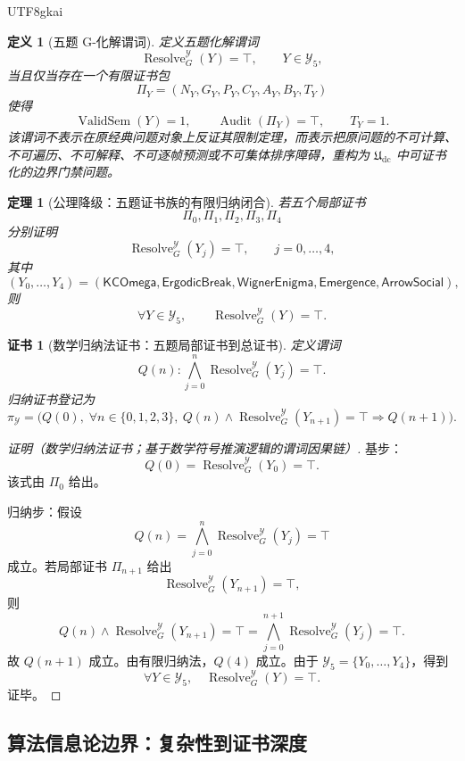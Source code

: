 \documentclass[12pt]{article}
\newtheorem{definition}{定义}[section]
\newtheorem{theorem}{定理}[section]
\newtheorem{Certificate}{证书}[section]
\newcommand{\Udc}{\mathfrak{U}_{\mathrm{dc}}}
\DeclareMathOperator{\Audit}{Audit}
\DeclareMathOperator{\Resolve}{Resolve}
\DeclareMathOperator{\ValidSem}{ValidSem}
\begin{document}
\begin{CJK*}{UTF8}{gkai}
\begin{definition}[五题 G-化解谓词]
\label{def:tex59-y5-resolution}
定义五题化解谓词
\[
  \Resolve_G^{\mathcal Y}(Y)=\top,
  \qquad Y\in\mathcal Y_5,
\]
当且仅当存在一个有限证书包
\[
  \Pi_Y
  =
  (N_Y,G_Y,P_Y,C_Y,A_Y,B_Y,T_Y)
\]
使得
\[
  \ValidSem(Y)=1,\qquad
  \Audit(\Pi_Y)=\top,\qquad
  T_Y=1.
\]
该谓词不表示在原经典问题对象上反证其限制定理，而表示把原问题的不可计算、
不可遍历、不可解释、不可逐帧预测或不可集体排序障碍，重构为 \(\Udc\) 中可证书化的边界门禁问题。
\end{definition}

\begin{theorem}[公理降级：五题证书族的有限归纳闭合]
\label{thm:tex59-y5-induction}
若五个局部证书
\[
  \Pi_0,\Pi_1,\Pi_2,\Pi_3,\Pi_4
\]
分别证明
\[
  \Resolve_G^{\mathcal Y}(Y_j)=\top,
  \qquad j=0,\ldots,4,
\]
其中
\[
  (Y_0,\ldots,Y_4)
  =
  (
  \mathsf{KCOmega},
  \mathsf{ErgodicBreak},
  \mathsf{WignerEnigma},
  \mathsf{Emergence},
  \mathsf{ArrowSocial}
  ),
\]
则
\[
  \forall Y\in\mathcal Y_5,\qquad
  \Resolve_G^{\mathcal Y}(Y)=\top.
\]
\end{theorem}

\begin{Certificate}[数学归纳法证书：五题局部证书到总证书]
\label{cert:tex59-y5-induction}
定义谓词
\[
  Q(n):
  \bigwedge_{j=0}^{n}
  \Resolve_G^{\mathcal Y}(Y_j)=\top.
\]
归纳证书登记为
\[
  \pi_{\mathcal Y}
  =
  \bigl(
  Q(0),\;
  \forall n\in\{0,1,2,3\},\ Q(n)\wedge
  \Resolve_G^{\mathcal Y}(Y_{n+1})=\top
  \Rightarrow Q(n+1)
  \bigr).
\]
\end{Certificate}

\begin{proof}[证明（数学归纳法证书；基于数学符号推演逻辑的谓词因果链）]
基步：
\[
  Q(0)
  =
  \Resolve_G^{\mathcal Y}(Y_0)=\top.
\]
该式由 \(\Pi_0\) 给出。

归纳步：假设
\[
  Q(n)=
  \bigwedge_{j=0}^{n}\Resolve_G^{\mathcal Y}(Y_j)=\top
\]
成立。若局部证书 \(\Pi_{n+1}\) 给出
\[
  \Resolve_G^{\mathcal Y}(Y_{n+1})=\top,
\]
则
\[
  Q(n)\wedge
  \Resolve_G^{\mathcal Y}(Y_{n+1})=\top
  =
  \bigwedge_{j=0}^{n+1}\Resolve_G^{\mathcal Y}(Y_j)=\top.
\]
故 \(Q(n+1)\) 成立。由有限归纳法，\(Q(4)\) 成立。由于
\(\mathcal Y_5=\{Y_0,\ldots,Y_4\}\)，得到
\[
  \forall Y\in\mathcal Y_5,\quad
  \Resolve_G^{\mathcal Y}(Y)=\top.
\]
证毕。
\end{proof}

\subsection{算法信息论边界：复杂性到证书深度}
\label{subsec:tex59-kolmogorov-chaitin}


\end{CJK*}
\end{document}
